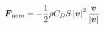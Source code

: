 \documentclass[10pt]{article}
\begin{document}
\begin{align*}\boldsymbol{F}_{\rm aero} = - \frac{1}{2} \rho C_D S \left| \boldsymbol{v} \right|^2 \frac{ \boldsymbol{v} }{\left| \boldsymbol{v} \right|} \end{align*}
\end{document}
